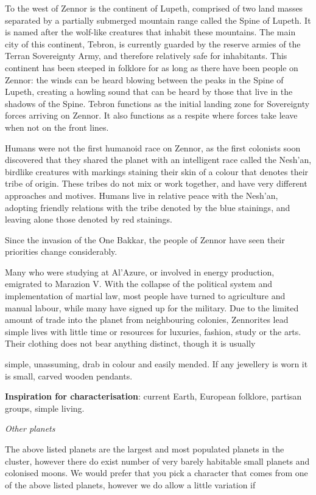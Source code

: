 \documentclass{scrbook}
\begin{document}
To the west of Zennor is the continent of Lupeth, comprised of two land masses separated by a partially submerged mountain range called the Spine of Lupeth. It is named after the wolf-like creatures that inhabit these mountains. The main city of this continent, Tebron, is currently guarded by the reserve armies of the Terran Sovereignty Army, and therefore relatively safe for inhabitants. This continent has been steeped in folklore for as long as there have been people on Zennor: the winds can be heard blowing between the peaks in the Spine of Lupeth, creating a howling sound that can be heard by those that live in the shadows of the Spine. Tebron functions as the initial landing zone for Sovereignty forces arriving on Zennor. It also functions as a respite where forces take leave when not on the front lines.

Humans were not the first humanoid race on Zennor, as the first colonists soon discovered that they shared the planet with an intelligent race called the Nesh'an, birdlike creatures with markings staining their skin of a colour that denotes their tribe of origin. These tribes do not mix or work together, and have very different approaches and motives. Humans live in relative peace with the Nesh'an, adopting friendly relations with the tribe denoted by the blue stainings, and leaving alone those denoted by red stainings.

Since the invasion of the One Bakkar, the people of Zennor have seen their priorities change considerably.

Many who were studying at Al'Azure, or involved in energy production, emigrated to Marazion V. With the collapse of the political system and implementation of martial law, most people have turned to agriculture and manual labour, while many have signed up for the military. Due to the limited amount of trade into the planet from neighbouring colonies, Zennorites lead simple lives with little time or resources for luxuries, fashion, study or the arts. Their clothing does not bear anything distinct, though it is usually

simple, unassuming, drab in colour and easily mended. If any jewellery is worn it is small, carved wooden pendants.

\textbf{Inspiration for characterisation}: current Earth, European folklore, partisan groups, simple living.

\textit{Other planets}

The above listed planets are the largest and most populated planets in the cluster, however there do exist number of very barely habitable small planets and colonised moons. We would prefer that you pick a character that comes from one of the above listed planets, however we do allow a little variation if
\end{document}
